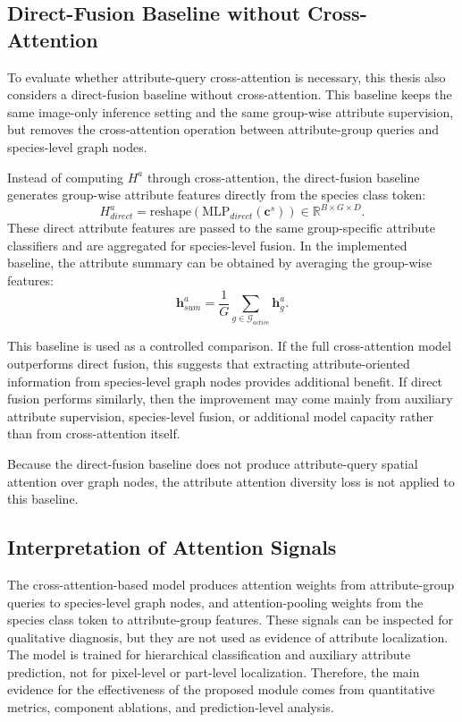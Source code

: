 \subsection{Direct-Fusion Baseline without Cross-Attention}

To evaluate whether attribute-query cross-attention is necessary, this thesis also considers a direct-fusion baseline without cross-attention. This baseline keeps the same image-only inference setting and the same group-wise attribute supervision, but removes the cross-attention operation between attribute-group queries and species-level graph nodes.

Instead of computing \(H^{a}\) through cross-attention, the direct-fusion baseline generates group-wise attribute features directly from the species class token:
\begin{equation}
    H^{a}_{direct}
    =
    \mathrm{reshape}
    \left(
        \mathrm{MLP}_{direct}(\mathbf{c}^{s})
    \right)
    \in
    \mathbb{R}^{B \times G \times D}.
\end{equation}
These direct attribute features are passed to the same group-specific attribute classifiers and are aggregated for species-level fusion. In the implemented baseline, the attribute summary can be obtained by averaging the group-wise features:
\begin{equation}
    \mathbf{h}^{a}_{sum}
    =
    \frac{1}{G}
    \sum_{g \in \mathcal{G}_{active}}
    \mathbf{h}^{a}_{g}.
\end{equation}

This baseline is used as a controlled comparison. If the full cross-attention model outperforms direct fusion, this suggests that extracting attribute-oriented information from species-level graph nodes provides additional benefit. If direct fusion performs similarly, then the improvement may come mainly from auxiliary attribute supervision, species-level fusion, or additional model capacity rather than from cross-attention itself.

Because the direct-fusion baseline does not produce attribute-query spatial attention over graph nodes, the attribute attention diversity loss is not applied to this baseline.

\subsection{Interpretation of Attention Signals}

The cross-attention-based model produces attention weights from attribute-group queries to species-level graph nodes, and attention-pooling weights from the species class token to attribute-group features. These signals can be inspected for qualitative diagnosis, but they are not used as evidence of attribute localization. The model is trained for hierarchical classification and auxiliary attribute prediction, not for pixel-level or part-level localization. Therefore, the main evidence for the effectiveness of the proposed module comes from quantitative metrics, component ablations, and prediction-level analysis.

